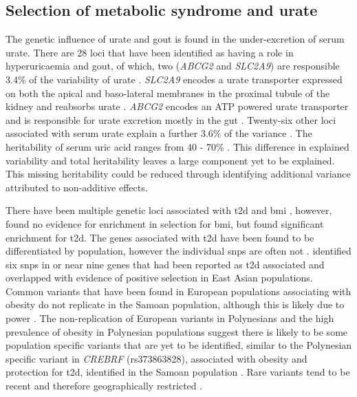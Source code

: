 \documentclass[]{report}
\begin{document}
\subsection{Selection of metabolic syndrome and urate}\label{goutMetSyn}

The genetic influence of urate and gout is found in the under-excretion
of serum urate. There are 28 loci that have been identified as having a
role in hyperuricaemia and gout, of which, two (\emph{ABCG2} and
\emph{SLC2A9}) are responsible 3.4\% of the variability of urate
\citep{Kottgen2013}. \emph{SLC2A9} encodes a urate transporter expressed
on both the apical and baso-lateral membranes in the proximal tubule of
the kidney and reabsorbs urate \citep{Mandal2015}. \emph{ABCG2} encodes
an ATP powered urate transporter and is responsible for urate excretion
mostly in the gut \citep{Maliepaard2001, Mandal2015}. Twenty-six other
loci associated with serum urate explain a further 3.6\% of the variance
\citep{Kottgen2013}. The heritability of serum uric acid ranges from 40
- 70\% \citep{Yang2005, Nath2007}. This difference in explained
variability and total heritability leaves a large component yet to be
explained. This missing heritability could be reduced through
identifying additional variance attributed to non-additive effects.

There have been multiple genetic loci associated with \gls{t2d}
\citep{Billings2010} and \gls{bmi} \citep{Locke2015}, however,
\citet{Chen2010} found no evidence for enrichment in selection for
\gls{bmi}, but found significant enrichment for \gls{t2d}. The genes
associated with \gls{t2d} have been found to be differentiated by
population, however the individual \glspl{snp} are often not
\citep{pickrell2009signals}. \citet{Koh2014} identified six \glspl{snp}
in or near nine genes that had been reported as \gls{t2d} associated and
overlapped with evidence of positive selection in East Asian
populations. Common variants that have been found in European
populations associating with obesity do not replicate in the Samoan
population, although this is likely due to power \citep{Karns2012}. The
non-replication of European variants in Polynesians and the high
prevalence of obesity in Polynesian populations suggest there is likely
to be some population specific variants that are yet to be identified,
similar to the Polynesian specific variant in \emph{CREBRF}
(rs373863828), associated with obesity and protection for \gls{t2d},
identified in the Samoan population \citep{Minster2016}. Rare variants
tend to be recent and therefore geographically restricted
\citep{1KGP2012}.
\end{document}
